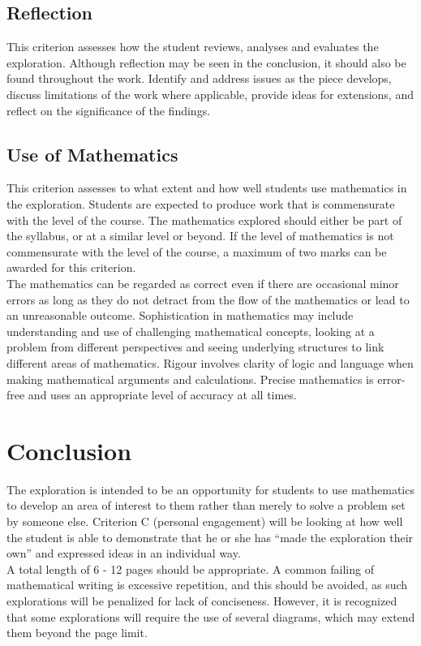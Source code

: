 \documentclass[11pt]{article}
\begin{document}
\subsection{Reflection}
This criterion assesses how the student reviews, analyses and evaluates the exploration. Although reflection may be seen in the conclusion, it should also be found throughout the work. Identify and address issues as the piece develops, discuss limitations of the work where applicable, provide ideas for extensions, and reflect on the significance of the findings.

\subsection{Use of Mathematics}
This criterion assesses to what extent and how well students use mathematics in the exploration. Students are expected to produce work that is commensurate with the level of the course. The mathematics explored should either be part of the syllabus, or at a similar level or beyond. If the level of mathematics is not commensurate with the level of the course, a maximum of two marks can be awarded for this criterion.\\

The mathematics can be regarded as correct even if there are occasional minor errors as long as they do not detract from the flow of the mathematics or lead to an unreasonable outcome. Sophistication in mathematics may include understanding and use of challenging mathematical concepts, looking at a problem from different perspectives and seeing underlying structures to link different areas of mathematics. Rigour involves clarity of logic and language when making mathematical arguments and calculations. Precise mathematics is error-free and uses an appropriate level of accuracy at all times.

\section{Conclusion}
The exploration is intended to be an opportunity for students to use mathematics to develop an area of interest to them rather than merely to solve a problem set by someone else. Criterion C (personal engagement) will be looking at how well the student is able to demonstrate that he or she has “made the exploration their own” and expressed ideas in an individual way. \\

A total length of 6 - 12 pages should be appropriate. A common failing of mathematical writing is excessive repetition, and this should be avoided, as such explorations will be penalized for lack of conciseness. However, it is recognized that some explorations will require the use of several diagrams, which may extend them beyond the page limit.\\
\end{document}
